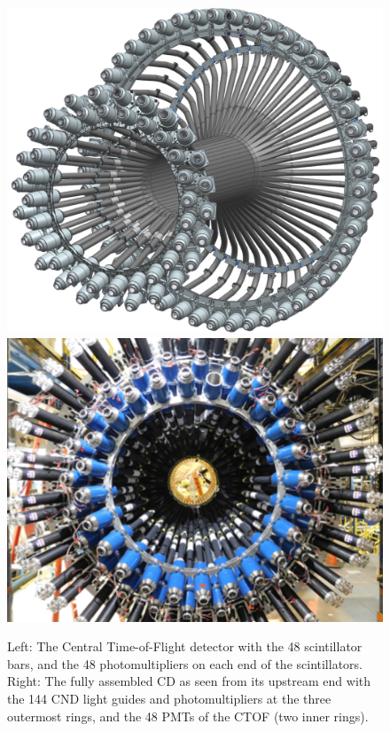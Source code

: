 \documentclass[final,3p,twocolumn]{elsarticle}
\begin{document}
\begin{figure}[htbp!]
\hspace{-0.3cm}\centerline{\includegraphics[width=1.1\columnwidth]{ctof-design.png}
\hspace{0.3cm}\includegraphics[angle=90,width=0.8\columnwidth]{cnd-ctof.png}}
\caption{Left: The Central Time-of-Flight detector with the 48 scintillator bars, and the 
48 photomultipliers on each end of the scintillators. Right: The fully assembled CD as seen from its upstream 
end with the 144 CND light guides and photomultipliers 
at the three outermost rings, and the 48 PMTs of the CTOF (two inner rings). } 
\label{ctof-cnd}
\end{figure} 
\end{document}
